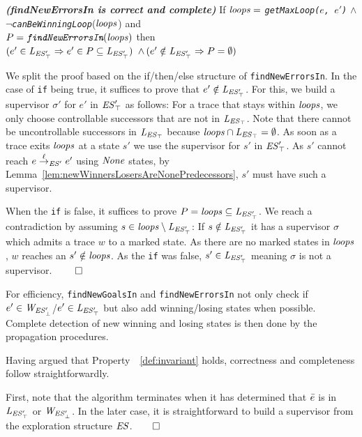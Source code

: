 \begin{lemma}\textbf{\emph{(findNewErrorsIn is correct and complete)}}
\label{lem:findErrorsWorks}
If $\mathit{loops} =$ \emph{\texttt{getMaxLoop($e$, $e'$)}} $\wedge$\\ 
$\neg$\emph{\texttt{canBeWinningLoop}}($\mathit{loops}$) and \\
$P=\emph{\texttt{findNewErrorsIn}}(\mathit{loops})$ then \\
$(e' \in \mathit{L_{\mathit{\mathit{ES}'_{\top}}}} \Rightarrow e' \in P 
\subseteq \mathit{L_{\mathit{\mathit{ES}'_{\top}}}})$ $\wedge \, (e' \notin \mathit{L_{\mathit{\mathit{ES}'_{\top}}}} \Rightarrow P = 
\emptyset)$
\end{lemma}

\begin{Proof Sketch}
We split the proof based on the if/then/else structure of \texttt{findNewErrorsIn}. 
In the case of \texttt{if} being true, it suffices to prove that $e' \notin \mathit{L_{\mathit{\mathit{ES}'_{\top}}}}$. For this, 
we build a supervisor $\sigma'$ for $e'$ in $\mathit{\mathit{ES}'_{\top}}$ as 
follows: For a trace that stays within $\mathit{loops}$, we only choose controllable successors 
that are not 
in $\mathit{L_{\mathit{\mathit{ES}_{\top}}}}$. Note that there cannot be uncontrollable successors in $\mathit{L_{\mathit{\mathit{ES}_{\top}}}}$ because 
$\mathit{loops} \cap \mathit{L_{\mathit{\mathit{ES}_{\top}}}}= \emptyset$.   As soon as a trace exits $\mathit{loops}$ at a state $s'$ we 
use the supervisor for $s'$ in $\mathit{\mathit{ES}'_{\top}}$. 
As $s'$ cannot reach $e \overset{\ell}{\rightarrow}_{\mathit{ES}'} 
e'$ using $\mathit{None}$ states, by 
Lemma~\ref{lem:newWinnersLosersAreNonePredecessors}, $s'$ must have such a 
supervisor. 

When the \texttt{if} is false, it suffices to prove $P = \mathit{loops} \subseteq \mathit{L_{\mathit{\mathit{ES}'_{\top}}}}$. We 
reach a contradiction  
 by assuming $s \in \mathit{loops} \setminus \mathit{L_{\mathit{\mathit{ES}'_{\top}}}}$: If $s 
\notin \mathit{L_{\mathit{\mathit{ES}'_{\top}}}}$ it has a supervisor $\sigma$ which admits a trace $w$ to a marked 
state. 
As 
there are no marked states in $\mathit{loops}$, $w$ reaches an  $s' \notin \mathit{loops}$. As 
the 
\texttt{if} was false, $s' \in \mathit{L_{\mathit{\mathit{ES}'_{\top}}}}$ meaning $\sigma$ is not a supervisor.
\hfill$\qed$
\end{Proof Sketch}

For efficiency,  \texttt{findNewGoalsIn} and 
\texttt{findNewErrorsIn} not only check if $e' \in \mathit{W_{\mathit{\mathit{ES}'_{\bot}}}}$/$e' \in 
\mathit{L_{\mathit{\mathit{ES}'_{\top}}}}$ but also add  winning/losing states when 
possible. Complete detection of new winning and losing states is 
then done by the propagation procedures. 

Having argued that Property~~\ref{def:invariant} holds, correctness 
and completeness follow straightforwardly. 

First, note that the algorithm terminates when it has determined 
that $\bar{e}$ is in $\mathit{L_{\mathit{\mathit{ES}'_{\top}}}}$ or $\mathit{W_{\mathit{\mathit{ES}'_{\bot}}}}$. In the later case, it is 
straightforward to build a supervisor from the exploration structure 
$\mathit{ES}$.\hfill$\qed$

